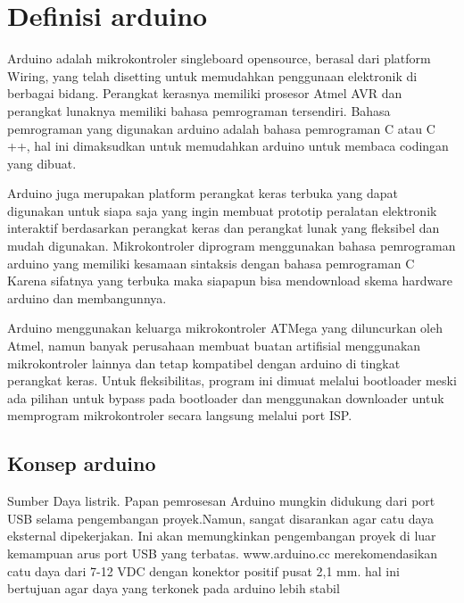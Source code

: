 \section{Definisi arduino}
Arduino adalah mikrokontroler singleboard opensource, berasal dari platform Wiring, yang telah disetting untuk memudahkan penggunaan elektronik di berbagai bidang. Perangkat kerasnya memiliki prosesor Atmel AVR dan perangkat lunaknya memiliki bahasa pemrograman tersendiri. Bahasa pemrograman yang digunakan arduino adalah bahasa pemrograman C atau C ++, hal ini dimaksudkan untuk memudahkan arduino untuk membaca codingan yang dibuat.


Arduino juga merupakan platform perangkat keras terbuka yang dapat digunakan untuk siapa saja yang ingin membuat prototip peralatan elektronik interaktif berdasarkan perangkat keras dan perangkat lunak yang fleksibel dan mudah digunakan. Mikrokontroler diprogram menggunakan bahasa pemrograman arduino yang memiliki kesamaan sintaksis dengan bahasa pemrograman C Karena sifatnya yang terbuka maka siapapun bisa mendownload skema hardware arduino dan membangunnya.

Arduino menggunakan keluarga mikrokontroler ATMega yang diluncurkan oleh Atmel, namun banyak perusahaan membuat buatan artifisial menggunakan mikrokontroler lainnya dan tetap kompatibel dengan arduino di tingkat perangkat keras. Untuk fleksibilitas, program ini dimuat melalui bootloader meski ada pilihan untuk bypass pada bootloader dan menggunakan downloader untuk memprogram mikrokontroler secara langsung melalui port ISP.

\subsection{Konsep arduino}
	Sumber Daya listrik. Papan pemrosesan Arduino mungkin didukung dari port USB selama pengembangan proyek.Namun, sangat disarankan agar catu daya eksternal dipekerjakan. Ini akan memungkinkan pengembangan proyek di luar kemampuan arus port USB yang terbatas. www.arduino.cc merekomendasikan catu daya dari 7-12 VDC dengan konektor positif pusat 2,1 mm. hal ini bertujuan agar daya yang terkonek pada arduino lebih stabil
